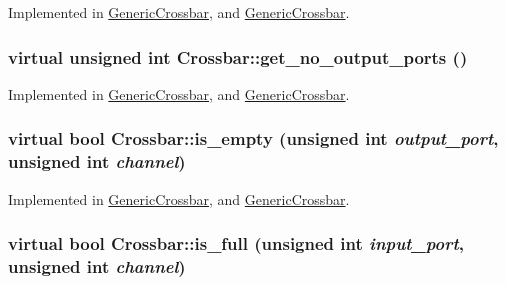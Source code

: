 Implemented in \hyperlink{classGenericCrossbar_8758e38060de9899fa70ad069b83e9fc}{GenericCrossbar}, and \hyperlink{classGenericCrossbar_8758e38060de9899fa70ad069b83e9fc}{GenericCrossbar}.\hypertarget{classCrossbar_fa381d5e1af2576a2aaa5fb392072918}{
\subsubsection[{get\_\-no\_\-output\_\-ports}]{\setlength{\rightskip}{0pt plus 5cm}virtual unsigned int Crossbar::get\_\-no\_\-output\_\-ports ()}}
\label{classCrossbar_fa381d5e1af2576a2aaa5fb392072918}




Implemented in \hyperlink{classGenericCrossbar_6ca09eb5520228b39d718e3994a5b84f}{GenericCrossbar}, and \hyperlink{classGenericCrossbar_6ca09eb5520228b39d718e3994a5b84f}{GenericCrossbar}.\hypertarget{classCrossbar_dc95dc76ac1c9f02a80ce7ada4559ce3}{
\subsubsection[{is\_\-empty}]{\setlength{\rightskip}{0pt plus 5cm}virtual bool Crossbar::is\_\-empty (unsigned int {\em output\_\-port}, \/  unsigned int {\em channel})}}
\label{classCrossbar_dc95dc76ac1c9f02a80ce7ada4559ce3}




Implemented in \hyperlink{classGenericCrossbar_b1dc236c4543805ac9fd50f25adcc27e}{GenericCrossbar}, and \hyperlink{classGenericCrossbar_b1dc236c4543805ac9fd50f25adcc27e}{GenericCrossbar}.\hypertarget{classCrossbar_350fd72418bcb525209ae9e10c834468}{
\subsubsection[{is\_\-full}]{\setlength{\rightskip}{0pt plus 5cm}virtual bool Crossbar::is\_\-full (unsigned int {\em input\_\-port}, \/  unsigned int {\em channel})}}
\label{classCrossbar_350fd72418bcb525209ae9e10c834468}




